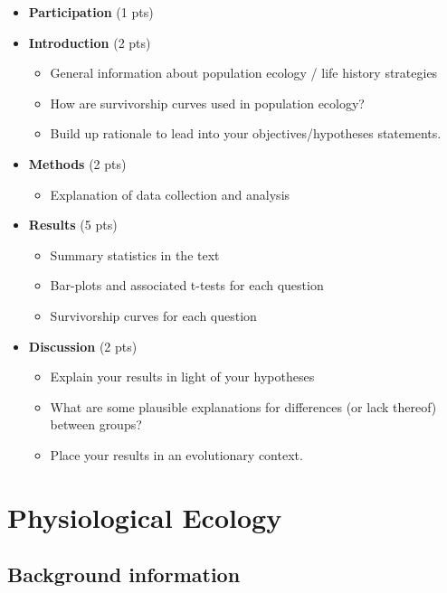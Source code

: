\documentclass[]{book}
\providecommand{\tightlist}{%
  \setlength{\itemsep}{0pt}\setlength{\parskip}{0pt}}
\begin{document}
\begin{itemize}
\item
  \textbf{Participation} (1 pts)
\item
  \textbf{Introduction} (2 pts)

  \begin{itemize}
  \tightlist
  \item
    General information about population ecology / life history strategies
  \item
    How are survivorship curves used in population ecology?
  \item
    Build up rationale to lead into your objectives/hypotheses statements.
  \end{itemize}
\item
  \textbf{Methods} (2 pts)

  \begin{itemize}
  \tightlist
  \item
    Explanation of data collection and analysis
  \end{itemize}
\item
  \textbf{Results} (5 pts)

  \begin{itemize}
  \tightlist
  \item
    Summary statistics in the text
  \item
    Bar-plots and associated t-tests for each question
  \item
    Survivorship curves for each question
  \end{itemize}
\item
  \textbf{Discussion} (2 pts)

  \begin{itemize}
  \tightlist
  \item
    Explain your results in light of your hypotheses
  \item
    What are some plausible explanations for differences (or lack thereof) between groups?
  \item
    Place your results in an evolutionary context.
  \end{itemize}
\end{itemize}

\hypertarget{physiological-ecology}{%
\chapter{Physiological Ecology}\label{physiological-ecology}}

\hypertarget{background-information-1}{%
\section{Background information}\label{background-information-1}}
\end{document}
